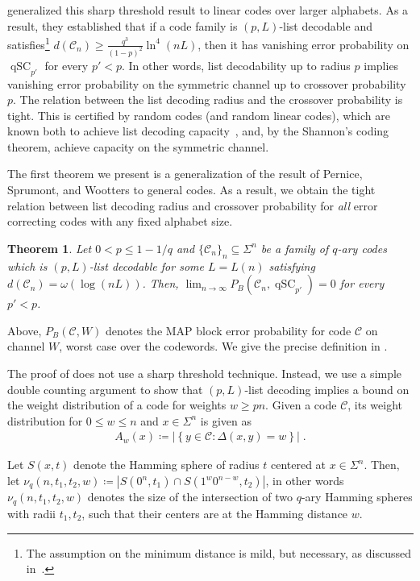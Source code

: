 \documentclass{article}
\DeclareMathOperator{\qSC}{qSC}
\newcommand{\cC}{\mathcal{C}}
\theoremstyle{plain}
\theoremstyle{plain}
\newtheorem{theorem}[definition]{Theorem}%
\theoremstyle{plain}
\theoremstyle{plain}
\theoremstyle{plain}
\theoremstyle{plain}
\theoremstyle{plain}
\theoremstyle{plain}
\theoremstyle{plain}
\theoremstyle{plain}
\theoremstyle{remark}
\theoremstyle{remark}
\theoremstyle{remark}
\theoremstyle{plain}
\begin{document}
\cite{pernice2025list}
generalized this sharp threshold result to linear codes over larger alphabets.
As a result, they established that if a code family
is $(p,L)$-list decodable and satisfies\footnote{The assumption
on the minimum distance is mild,
but necessary, as discussed in~\cite{pernice2025list}.} 
$d(\cC_n)\ge\frac{q^3}{(1-p)^2}\ln^4(nL)$,
then it has vanishing error probability
on $\qSC_{p'}$
for every $p'<p$. In other words,
list decodability up to radius $p$
implies vanishing error probability on
the symmetric channel
up to crossover probability $p$.
The relation between the list decoding radius
and the crossover probability is tight.
This is certified by random codes (and random linear codes),
which are known both to achieve
list decoding capacity~\cite{Eli91, GHK10},
and, by the Shannon's coding theorem,
achieve capacity on the symmetric channel.

The first theorem we present is a generalization of the
result of Pernice, Sprumont, and Wootters
to general codes. As a result, we obtain 
the tight relation between list decoding radius
and crossover probability for \emph{all}
error correcting codes with any fixed alphabet size.

\begin{theorem}
\label{thm:list-vs-qsc-main}
Let $0<p\le 1-1/q$ and 
$\{\cC_n\}_n\subseteq\Sigma^n$ be a family
of $q$-ary codes 
which is $(p,L)$-list decodable
for some $L=L(n)$ satisfying
$d(\cC_n)=\omega(\log(nL))$.
 Then,
$\lim_{n\to\infty} P_B(\cC_n,\qSC_{p'})=0$
for every $p'<p$.
\end{theorem}

Above, $P_B(\cC,W)$ denotes the MAP block error
probability for code $\cC$ on channel $W$,
worst case over the codewords. We give the precise
definition in .

The proof of 
does not use a sharp threshold technique.
Instead, we use a simple double counting 
argument to show that $(p,L)$-list decoding implies
a bound on the weight distribution of a code for weights
$w\ge pn$. Given a code $\cC$, its weight distribution
for $0\le w\le n$ and $x\in\Sigma^n$ is given as
\begin{align*}
A_w(x)\coloneqq
\left|\left\{
y\in\cC:\Delta(x,y)=w
\right\}\right|\;.
\end{align*}

Let $S(x,t)$ denote the Hamming sphere of radius $t$ centered at $x\in\Sigma^n$. Then,
let $\nu_q(n,t_1,t_2,w)\coloneqq|S(0^n,t_1)\cap S(1^w0^{n-w},t_2)|$, 
in other words $\nu_q(n,t_1,t_2,w)$ denotes the
size of the intersection of two $q$-ary Hamming spheres
with radii $t_1,t_2$, such that their centers
are at the Hamming distance $w$.
\end{document}
